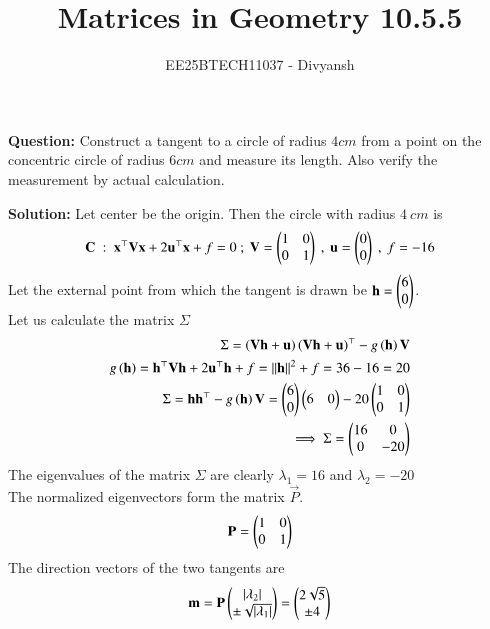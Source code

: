 \documentclass[journal,12pt,onecolumn]{IEEEtran}
\title{Matrices in Geometry 10.5.5}
\author{EE25BTECH11037 - Divyansh}
\theoremstyle{remark}
\begin{document}
\vspace{3cm}
\maketitle
{\let\newpage\relax\maketitle}
\textbf{Question: }
Construct a tangent to a circle of radius $4cm$ from a point on the concentric circle of radius $6cm$ and measure its length. Also verify the measurement by actual calculation.
\vspace{2mm}


\textbf{Solution:}
Let center be the origin. Then the circle with radius $4 \ cm$ is
\begin{align}
    \mathbf{C} \ : \ \mathbf{x}^{\top}\mathbf{V}\mathbf{x} + 2\mathbf{u}^{\top}\mathbf{x} + f=0 \ ; \ \mathbf{V}=\begin{pmatrix}1&0\\0&1\end{pmatrix} \ , \ \mathbf{u}=\begin{pmatrix}0\\0\end{pmatrix} \ , \ f=-16
\end{align}
Let the external point from which the tangent is drawn be $\mathbf{h}=\begin{pmatrix}6\\0\end{pmatrix}$.\\
Let us calculate the matrix $\Sigma$
\begin{align}
    \Sigma=\left(\mathbf{V}\mathbf{h} + \mathbf{u}\right)\left(\mathbf{V}\mathbf{h} + \mathbf{u}\right)^{\top} - g\left(\mathbf{h}\right)\mathbf{V}\\
    g\left(\mathbf{h}\right)=\mathbf{h}^{\top}\mathbf{V}\mathbf{h} + 2\mathbf{u}^{\top}\mathbf{h} + f =\left\lVert\mathbf{h}\right\rVert^2 +f =36-16 =20\\
    \Sigma = \mathbf{h}\mathbf{h}^{\top} - g\left(\mathbf{h}\right)\mathbf{V}=\begin{pmatrix}6 \\ 0\end{pmatrix}\begin{pmatrix}6 & 0\end{pmatrix} - 20\begin{pmatrix} 1& 0 \\ 0 &1\end{pmatrix}\\
    \implies \Sigma=\begin{pmatrix}16 & 0 \\ 0 & -20\end{pmatrix}
\end{align}
The eigenvalues of the matrix $\Sigma$ are clearly $\lambda_1=16$ and $\lambda_2=-20$\\
The normalized eigenvectors form the matrix $\vec{P}$.
\begin{align}
    \mathbf{P}=\begin{pmatrix}1 & 0\\0&1\end{pmatrix}
\end{align}
The direction vectors of the two tangents are
\begin{align}
    \mathbf{m}=\mathbf{P}\begin{pmatrix}\left\vert\lambda_2\right\vert \\ \pm\sqrt{\left\vert\lambda_1\right\vert}\end{pmatrix}=\begin{pmatrix}2\sqrt{5} \\ \pm 4\end{pmatrix}
\end{align}
\end{document}
